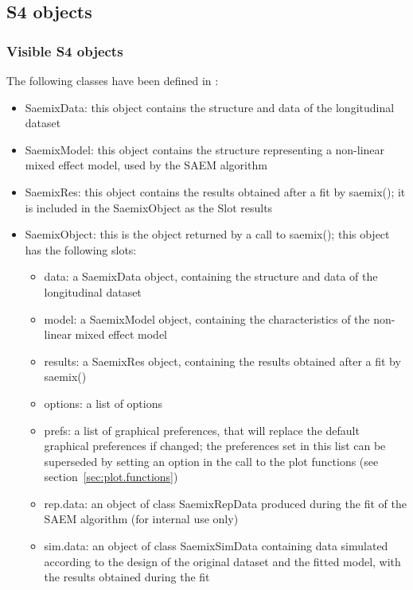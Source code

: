 \subsection{S4 objects}

\subsubsection{Visible S4 objects}

The following classes have been defined in \monolix:
\begin{itemize}
\item {\sf SaemixData}: this object contains the structure and data of the longitudinal dataset
\item {\sf SaemixModel}: this object contains the structure representing a non-linear mixed effect model, used by the {\sf SAEM} algorithm
\item {\sf SaemixRes}: this object contains the results obtained after a fit by {\sf saemix()}; it is included in the {\sf SaemixObject} as the Slot {\sf results}
\item {\sf SaemixObject}: this is the object returned by a call to {\sf saemix()}; this object has the following slots:
   \begin{itemize}
   \item data: a {\sf SaemixData} object, containing the structure and data of the longitudinal dataset
   \item model: a {\sf SaemixModel} object, containing the characteristics of the non-linear mixed effect model
   \item results: a {\sf SaemixRes} object, containing the results obtained after a fit by {\sf saemix()}
   \item options: a list of options
   \item prefs: a list of graphical preferences, that will replace the default graphical preferences if changed; the preferences set in this list can be superseded by setting an option in the call to the plot functions (see section~\ref{sec:plot.functions})
   \item rep.data: an object of class {\sf SaemixRepData} produced during the fit of the {\sf SAEM} algorithm (for internal use only)
   \item sim.data: an object of class {\sf SaemixSimData} containing data simulated according to the design of the original dataset and the fitted model, with the results obtained during the fit
   \end{itemize}
\end{itemize}

